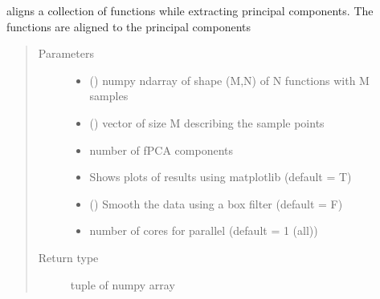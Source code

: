 \documentclass[letterpaper,10pt,english]{sphinxmanual}
\begin{document}
\begin{fulllineitems}
\label{\detokenize{time_warping:time_warping.align_fPCA}}
aligns a collection of functions while extracting principal components.
The functions are aligned to the principal components
\begin{quote}\begin{description}
\item[{Parameters}] \leavevmode\begin{itemize}
\item {} 
 () \textendash{} numpy ndarray of shape (M,N) of N functions with M samples

\item {} 
 () \textendash{} vector of size M describing the sample points

\item {} 
 \textendash{} number of fPCA components

\item {} 
 \textendash{} Shows plots of results using matplotlib (default = T)

\item {} 
 () \textendash{} Smooth the data using a box filter (default = F)

\item {} 
 \textendash{} number of cores for parallel (default = \sphinxhyphen{}1 (all))

\end{itemize}

\item[{Return type}] \leavevmode
tuple of numpy array


\end{description}
\end{quote}
\end{fulllineitems}
\end{document}
